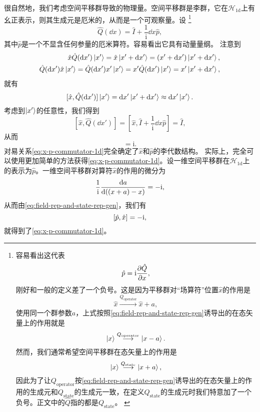 \documentclass[hyperref, UTF8, a4paper]{ctexart}
\newcommand*{\ii}{\mathrm{i}}
\begin{document}
很自然地，我们考虑空间平移群导致的物理量。空间平移群是李群，它在$\mathcal{H}_{1\text{d}}$上有幺正表示，则其生成元是厄米的，从而是一个可观察量。设%
\footnote{容易看出这代表
\[
    \hat{p} = \ii \pdv{\hat{Q}}{x},
\]
刚好和一般的定义差了一个负号。这是因为平移群对“场算符”位置$\hat{x}$的作用是
\[
    \hat{x} \stackrel{Q_\text{operator}}{\longrightarrow} \hat{x} + a,
\]
使用同一个群参数$a$，上式按照\eqref{eq:field-rep-and-state-rep-gen}诱导出的在态矢量上的作用就是
\[
    \ket{x} \stackrel{Q_\text{operator}}{\longrightarrow} \ket{x - a}.
\]
然而，我们通常希望空间平移群在态矢量上的作用是
\[
    \ket{x} \stackrel{Q_\text{state}}{\longrightarrow} \ket{x + a},
\]
因此为了让$Q_\text{operator}$按\eqref{eq:field-rep-and-state-rep-gen}诱导出的在态矢量上的作用的生成元和$Q_\text{state}$的生成元一致，在定义$Q_\text{state}$的生成元时我们特意加了一个负号。正文中的$\hat{Q}$指的都是$Q_\text{state}$。
\label{note:state-and-operator-minus-symbol}}
\begin{equation}
    \hat{Q}(\dd{x}) = \hat{I} + \frac{1}{\ii} \dd{x} \hat{p},
\end{equation}
其中$\hat{p}$是一个不显含任何参量的厄米算符。容易看出它具有动量量纲。
注意到
\[
    \begin{split}
        \hat{x} \hat{Q}(\dd{x'}) \ket{x'} = \hat{x} \ket{x' + \dd{x'}} = (x' + \dd{x'}) \ket{x' + \dd{x'}}, \\
        \hat{Q}(\dd{x'}) \hat{x} \ket{x'} = \hat{Q}(\dd{x'}) x' \ket{x'} = x' \hat{Q}(\dd{x'}) \ket{x'} = x' \ket{x' + \dd{x'}},
    \end{split}
\]
就有
\[
    [\hat{x}, \hat{Q}(\dd{x'})] \ket{x'} = \dd{x'} \ket{x' + \dd{x'}} \approx \dd{x'} \ket{x'}.
\]
考虑到$\ket{x'}$的任意性，我们得到
\[
    [\hat{x}, \hat{Q}(\dd{x'})] = \left[\hat{x}, \hat{I} + \frac{1}{\ii} \dd{x} \hat{p}\right] = \hat{I},
\]
从而
\begin{equation}
    [\hat{x}, \hat{p}] = \ii . 
    \label{eq:x-p-commutator-1d}   
\end{equation}
对易关系\eqref{eq:x-p-commutator-1d}完全确定了$\hat{x}$和$\hat{p}$的李代数结构。
实际上，完全可以使用更加简单的方法获得\eqref{eq:x-p-commutator-1d}。设一维空间平移群在$\mathcal{H}_\text{1d}$上的表示为$\hat{p}$。一维空间平移群对算符$\hat{x}$的作用的微分为
\[
    \frac{1}{\ii} \dv{a} {((x + a) - x)} = - \ii,
\]
从而由\eqref{eq:field-rep-and-state-rep-gen}，我们有
\[
    \comm{\hat{p}}{\hat{x}} = - \ii,
\]
就得到了\eqref{eq:x-p-commutator-1d}。
\end{document}
